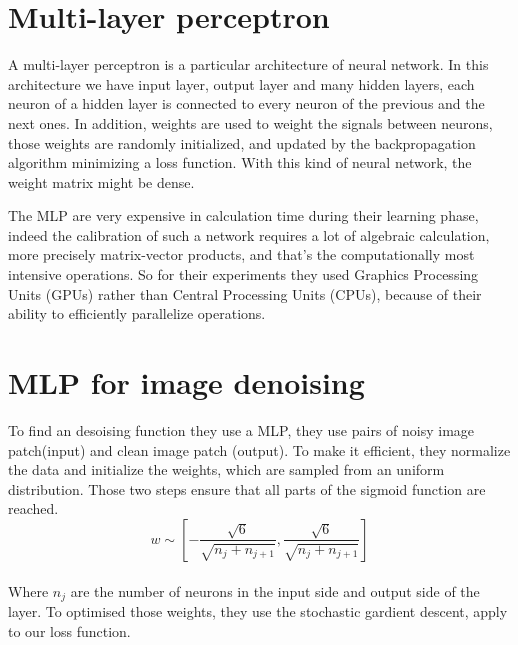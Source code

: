 \documentclass[10pt,a4paper]{article}
\newcommand{\svs}{\vspace{9pt}}
\begin{document}
\svs

\section{Multi-layer perceptron}

A multi-layer perceptron is a particular architecture of neural network. In this architecture we have input layer, output layer and many hidden layers, each neuron of a hidden layer is connected to every neuron of the previous and the next ones.  In addition, weights are used to weight the signals between neurons, those weights are randomly initialized, and updated by the backpropagation algorithm minimizing a loss function. With this kind of neural network, the weight matrix might be dense.


\svs 



The MLP are very expensive in calculation time during their learning phase, indeed the calibration of such a network requires a lot of algebraic calculation, more precisely matrix-vector products, and that's the computationally most intensive operations.
So for their experiments they used Graphics Processing Units (GPUs) rather than Central Processing Units (CPUs), because of their ability to efficiently parallelize operations.

\svs







\section{MLP for image denoising}


To find an desoising function they use a MLP, they use pairs of noisy image patch(input) and clean image patch (output). To make it efficient, they normalize the data and initialize the weights, which are sampled from an uniform distribution. Those two steps ensure that all parts of the sigmoid function are reached. \\%
$$w \sim [-\frac{\sqrt{6}}{\sqrt{n_j + n_{j+1}}}, \frac{\sqrt{6}}{\sqrt{n_j + n_{j+1}}} ]$$ \\
Where $n_j$ are the number of neurons in the input side and output side of the layer. To optimised those weights, they use the stochastic gardient descent, apply to our loss function.
\end{document}
